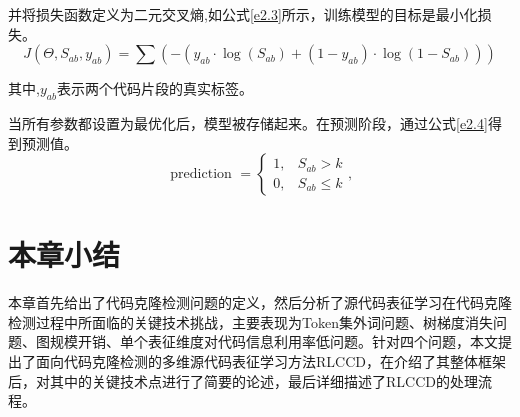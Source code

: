 并将损失函数定义为二元交叉熵,如公式\ref{e2.3}所示，训练模型的目标是最小化损失。
\begin{equation}\label{e2.3}
    J(\Theta, S_{ab}, y_{ab})=\sum(-(y_{ab} \cdot \log (S_{ab})+(1-y_{ab}) \cdot \log (1-S_{ab})))
\end{equation}

其中,$y_{ab}$表示两个代码片段的真实标签。

当所有参数都设置为最优化后，模型被存储起来。在预测阶段，通过公式\ref{e2.4}得到预测值。
\begin{equation}\label{e2.4}
    \text { prediction }=\left\{\begin{array}{ll}
        1, & S_{ab}>k \\
        0, & S_{ab} \leq k
        \end{array},\right.
\end{equation}

\section{本章小结}
\label{sec:Summary2}
本章首先给出了代码克隆检测问题的定义，然后分析了源代码表征学习在代码克隆检测过程中所面临的关键技术挑战，主要表现为Token集外词问题、树梯度消失问题、图规模开销、单个表征维度对代码信息利用率低问题。针对四个问题，本文提出了面向代码克隆检测的多维源代码表征学习方法RLCCD，在介绍了其整体框架后，对其中的关键技术点进行了简要的论述，最后详细描述了RLCCD的处理流程。
